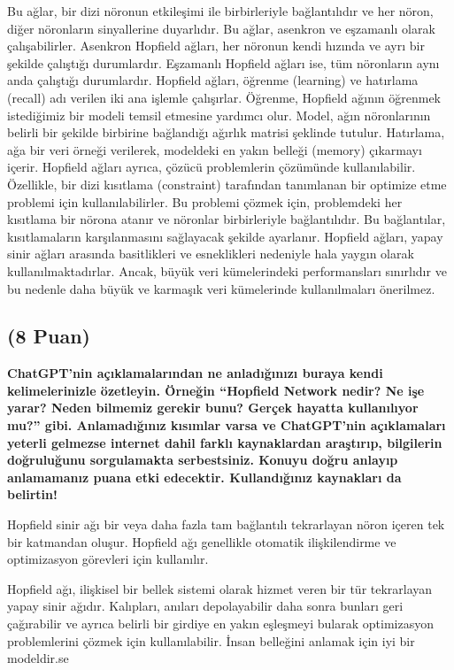 \documentclass[11pt]{article}
\begin{document}
Bu ağlar, bir dizi nöronun etkileşimi ile birbirleriyle bağlantılıdır ve her nöron, diğer nöronların sinyallerine duyarlıdır. Bu ağlar, asenkron ve eşzamanlı olarak çalışabilirler. Asenkron Hopfield ağları, her nöronun kendi hızında ve ayrı bir şekilde çalıştığı durumlardır. Eşzamanlı Hopfield ağları ise, tüm nöronların aynı anda çalıştığı durumlardır. Hopfield ağları, öğrenme (learning) ve hatırlama (recall) adı verilen iki ana işlemle çalışırlar. Öğrenme, Hopfield ağının öğrenmek istediğimiz bir modeli temsil etmesine yardımcı olur. Model, ağın nöronlarının belirli bir şekilde birbirine bağlandığı ağırlık matrisi şeklinde tutulur. Hatırlama, ağa bir veri örneği verilerek, modeldeki en yakın belleği (memory) çıkarmayı içerir. Hopfield ağları ayrıca, çözücü problemlerin çözümünde kullanılabilir. Özellikle, bir dizi kısıtlama (constraint) tarafından tanımlanan bir optimize etme problemi için kullanılabilirler. Bu problemi çözmek için, problemdeki her kısıtlama bir nörona atanır ve nöronlar birbirleriyle bağlantılıdır. Bu bağlantılar, kısıtlamaların karşılanmasını sağlayacak şekilde ayarlanır. Hopfield ağları, yapay sinir ağları arasında basitlikleri ve esneklikleri nedeniyle hala yaygın olarak kullanılmaktadırlar. Ancak, büyük veri kümelerindeki performansları sınırlıdır ve bu nedenle daha büyük ve karmaşık veri kümelerinde kullanılmaları önerilmez.

\subsection{(8 Puan)} \textbf{ChatGPT’nin açıklamalarından ne anladığınızı buraya kendi kelimelerinizle özetleyin. Örneğin ``Hopfield Network nedir? Ne işe yarar? Neden bilmemiz gerekir bunu? Gerçek hayatta kullanılıyor mu?'' gibi. Anlamadığınız kısımlar varsa ve ChatGPT’nin açıklamaları yeterli gelmezse internet dahil farklı kaynaklardan araştırıp, bilgilerin doğruluğunu sorgulamakta serbestsiniz. Konuyu doğru anlayıp anlamamanız puana etki edecektir. Kullandığınız kaynakları da belirtin!}

Hopfield sinir ağı bir veya daha fazla tam bağlantılı tekrarlayan nöron içeren tek bir katmandan oluşur. Hopfield ağı genellikle otomatik ilişkilendirme ve optimizasyon görevleri için kullanılır.

Hopfield ağı, ilişkisel bir bellek sistemi olarak hizmet veren bir tür tekrarlayan yapay sinir ağıdır. Kalıpları, anıları depolayabilir daha sonra bunları geri çağırabilir ve ayrıca belirli bir girdiye en yakın eşleşmeyi bularak optimizasyon problemlerini çözmek için kullanılabilir. İnsan belleğini anlamak için iyi bir modeldir.se
\end{document}
